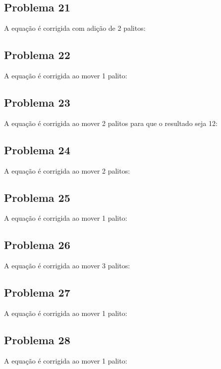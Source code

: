 \documentclass[a4paper,11pt]{article}
\begin{document}
  \digitFive \digitZero \digitEight

  \subsection*{Problema 21}
  A equação é corrigida com adição de 2 palitos:

  \digitOne \plus \digitOne \digitOne \equal \digitTwo \digitFour

  \subsection*{Problema 22}
  A equação é corrigida ao mover 1 palito:

  \digitTwo \plus \digitThree \equal \digitSix
  
  \subsection*{Problema 23}
  A equação é corrigida ao mover 2 palitos para que o resultado seja 12:

  \digitZero \plus \digitZero \equal \digitOne \digitTwo

  \subsection*{Problema 24}
  A equação é corrigida ao mover 2 palitos:

  \digitFive \plus \digitThree \equal \digitFive

  \subsection*{Problema 25}
  A equação é corrigida ao mover 1 palito:

  \digitOne \plus \digitSeven \equal \digitZero

  \subsection*{Problema 26}
  A equação é corrigida ao mover 3 palitos:

  \digitTwo \minus \digitTwo \equal \digitFive
  
  \subsection*{Problema 27}
  A equação é corrigida ao mover 1 palito:

  \digitZero \plus \digitThree \equal \digitTwo
  
  \subsection*{Problema 28}
  A equação é corrigida ao mover 1 palito:

  \digitZero \plus \digitOne \plus \digitTwo \equal \digitSeven

\begin{thebibliography}{4}
	
\end{thebibliography}
    
\end{document}
